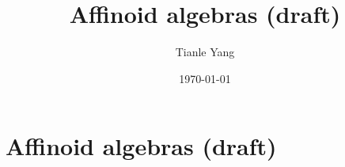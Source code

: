 \documentclass{noteformyself}
\title{Affinoid algebras (draft)}
\author{Tianle Yang}
\date{\today}
\begin{document}
    \maketitle

    \section{Affinoid algebras (draft)}



\end{document}
